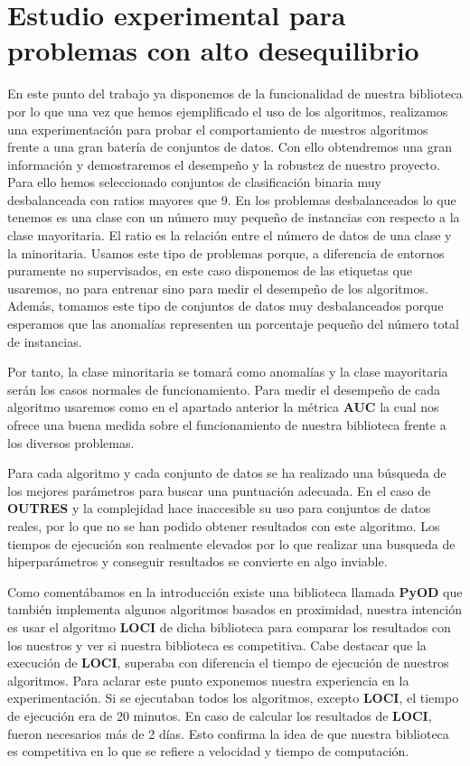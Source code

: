 \section{Estudio experimental para problemas con alto desequilibrio}
En este punto del trabajo ya disponemos de la funcionalidad de nuestra biblioteca por lo que 
una vez que hemos ejemplificado el uso de los algoritmos, realizamos una experimentación 
para probar el comportamiento de nuestros algoritmos frente a 
una gran batería de conjuntos de datos. Con ello obtendremos una gran información y demostraremos 
el desempeño y la robustez de nuestro proyecto. Para ello hemos seleccionado conjuntos de clasificación 
binaria muy desbalanceada con ratios mayores que 9. En los problemas desbalanceados
lo que tenemos es una clase con un número muy pequeño de instancias con respecto
a la clase mayoritaria. El ratio es la relación entre el número de datos de una clase y
la minoritaria. Usamos este tipo de problemas porque, a diferencia de entornos puramente no
supervisados, en este caso disponemos de las etiquetas que usaremos, no para entrenar sino 
para medir el desempeño de los algoritmos. Además, tomamos este tipo de conjuntos de datos 
muy desbalanceados porque esperamos que las anomalías representen un porcentaje pequeño del 
número total de instancias.


Por tanto, la clase minoritaria se tomará como 
anomalías y la clase mayoritaria serán los casos normales de funcionamiento. 
Para medir el desempeño de cada algoritmo usaremos como en el apartado anterior la 
métrica \textbf{AUC} la cual nos ofrece una buena medida sobre el funcionamiento  
de nuestra biblioteca frente a los diversos problemas. 

Para cada algoritmo y cada conjunto de datos se ha realizado una búsqueda de los mejores
parámetros para buscar una puntuación adecuada. En el caso de \textbf{OUTRES}  y la 
complejidad hace inaccesible su uso para conjuntos de datos reales, por lo que no se 
han podido obtener resultados con este algoritmo. Los tiempos de ejecución son realmente
elevados por lo que realizar una busqueda de hiperparámetros y conseguir resultados se
convierte en algo inviable.



Como comentábamos en la introducción existe una biblioteca llamada \textbf{PyOD} 
\cite{zhaoPyODPythonToolbox2019} \cite{zhaoPythonToolboxScalable2019} 
que también implementa algunos algoritmos basados en proximidad, nuestra intención es usar el 
algoritmo \textbf{LOCI} \cite{papadimitriouLOCIFastOutlier2003} de dicha biblioteca  
para comparar los resultados con los nuestros y ver si nuestra biblioteca es competitiva.
Cabe destacar que la execución de \textbf{LOCI}, superaba con diferencia el tiempo de ejecución
de nuestros algoritmos. Para aclarar este punto exponemos nuestra experiencia en la 
experimentación. Si se ejecutaban todos los algoritmos, excepto \textbf{LOCI}, el tiempo de ejecución
era de 20 minutos. En caso de calcular los resultados de \textbf{LOCI}, fueron necesarios más de 2
días.
Esto confirma la idea de que nuestra biblioteca es competitiva en lo que se refiere a velocidad
y tiempo de computación.


